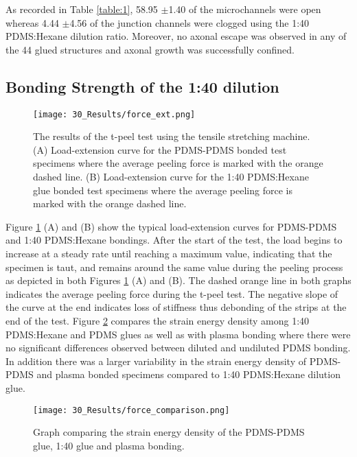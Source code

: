 As recorded in Table \ref{table:1}, 58.95 $\pm$1.40 of the microchannels were open whereas 4.44 $\pm$4.56 of the junction channels were clogged using the 1:40 PDMS:Hexane dilution ratio. Moreover, no axonal escape was observed in any of the 44 glued structures and axonal growth was successfully confined. 

\subsection{Bonding Strength of the 1:40 dilution}

\begin{figure}[H]
\centering
\texttt{[image: 30\_Results/force\_ext.png]}
\caption{The results of the t-peel test using the tensile stretching machine. (A) Load-extension curve for the PDMS-PDMS bonded test specimens where the average peeling force is marked with the orange dashed line. (B) Load-extension curve for the 1:40 PDMS:Hexane glue bonded test specimens where the average peeling force is marked with the orange dashed line.}
\label{fig:Glue Dilutions}
\end{figure}

Figure \ref{fig:Glue Dilutions} (A) and (B) show the typical load-extension curves for PDMS-PDMS  and 1:40 PDMS:Hexane bondings. After the start of the test, the load begins to increase at a steady rate until reaching a maximum value, indicating that the specimen is taut, and remains around the same value during the peeling process as depicted in both Figures \ref{fig:Glue Dilutions} (A) and (B). The dashed orange line in both graphs indicates the average peeling force during the t-peel test. The negative slope of the curve at the end indicates loss of stiffness thus debonding of the strips at the end of the test. Figure \ref{fig:forceComparison} compares the strain energy density among 1:40 PDMS:Hexane and PDMS glues as well as with plasma bonding where there were no significant differences observed between diluted and undiluted PDMS bonding. In addition there was a larger variability in the strain energy density of PDMS-PDMS and plasma bonded specimens compared to 1:40 PDMS:Hexane dilution glue.
\begin{figure}[H]
\centering
\texttt{[image: 30\_Results/force\_comparison.png]}
\caption{Graph comparing the strain energy density of the PDMS-PDMS glue, 1:40 glue and plasma bonding.}
\label{fig:forceComparison}
\end{figure}


